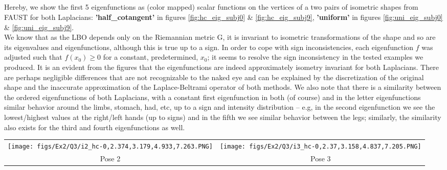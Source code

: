 \subsection{}\label{subsec:isom}
Hereby, we show the first 5 eigenfunctions as (color mapped) scalar
functions on the vertices of a two pairs of isometric shapes from FAUST for both Laplacians: \textbf{'half\_cotangent'} in figures \ref{fig:hc_eig_subj0} \& \ref{fig:hc_eig_subj9}, \textbf{'uniform'} in figures \ref{fig:uni_eig_subj0} \& \ref{fig:uni_eig_subj9}.\\
We know that as the LBO depends only on the Riemannian metric G, it is invariant to isometric transformations of the shape and so are its eigenvalues and eigenfunctions, although this is true up to a sign. In order to cope with sign inconsistencies, each eigenfunction $f$ was adjusted such that $f(x_0)\geq 0$ for a constant, predetermined, $x_0$; it seems to resolve the sign  inconsistency in the tested examples we produced. It is an evident from the figures that the eigenfunctions are indeed approximately isometry invariant for both Laplacians. There are perhaps negligible differences that are not recognizable to the naked eye and can be explained by the discretization of the original shape and the inaccurate approximation of the Laplace-Beltrami operator of both methods. We also note that there is a similarity between the ordered eigenfunctions of both Laplacians, with a constant first eigenfunction in both (of course) and in the letter eigenfunctions similar behavior around the limbs, stomach, had, etc, up to a sign and intensity distribution -- e.g, in the second eigenfunction we see the lowest/highest values at the right/left hands (up to signs) and in the fifth we see similar behavior between the legs; similarly, the similarity also exists for the third and fourth eigenfunctions as well. 

\begin{figure*}[h]
\centering
\begin{tabular}{cc}
    \texttt{[image: figs/Ex2/Q3/i2\_hc-0,2.374,3.179,4.933,7.263.PNG]} &
    \texttt{[image: figs/Ex2/Q3/i3\_hc-0,2.37,3.158,4.837,7.205.PNG]} \\
    \small Pose 2 & \small Pose 3
\end{tabular}
 \caption{\small The first 5 eigenfunctions of the \textbf{'half\_cotangent'} Laplacian, as (color mapped) scalar
functions on the vertices of two isometric shapes: two poses of subject \#0 from FAUST. The eigen vectors are Raster ordered -- left-to-right, up-tp-down. I.e, upper-left: eigenvector 1, upper-right: eigenvector 2, middle-left: eigenvector 3, middle-right: eigenvector 4, bottom: eigenvector 5}
 \label{fig:hc_eig_subj0}
\end{figure*}

